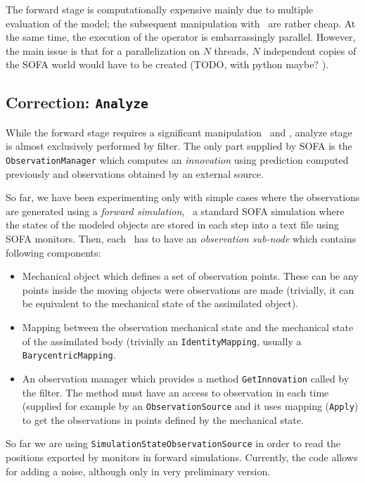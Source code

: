 \documentclass[10pt]{article}
\begin{document}
The forward stage is computationally  expensive mainly due to multiple evaluation of the model; the subsequent manipulation with \sstate\ are rather cheap. At the same time, the execution of the operator is embarrassingly parallel. However, the main issue is that for a parallelization on $N$ threads, $N$ independent copies of the SOFA world would have to be created (TODO, with python maybe? ).


\subsection{Correction: \texttt{Analyze}}
While the forward stage requires a significant manipulation \sstate\ and \asns, analyze stage is almost exclusively performed by filter. The only part supplied by SOFA is the \texttt{ObservationManager} which computes an \emph{innovation} using prediction computed previously and observations obtained by an external source. 

So far, we have been experimenting only with simple cases where the observations are generated using a \emph{forward simulation}, \ie\ a standard SOFA
simulation where the states of the modeled objects are stored in each step into a text file using SOFA monitors. Then, each \asn\ has to have an \emph{observation
sub-node} which contains following components:
\begin{itemize}
\item Mechanical object which defines a set of observation points. These can be any points inside the moving objects were observations are made (trivially, it can be equivalent to the mechanical 
state of the assimilated object).
\item Mapping between the observation mechanical state and the mechanical state of the assimilated body (trivially an \texttt{IdentityMapping}, usually a \texttt{BarycentricMapping}.
\item An observation manager which provides a method \texttt{GetInnovation} called by the filter. The method must have an access to observation in each time (supplied for example by an \texttt{ObservationSource} and it uses mapping (\texttt{Apply}) to get the observations in points
defined by the mechanical state. 
\end{itemize}

So far we are using \texttt{SimulationStateObservationSource} in order to read the positions exported by monitors in forward simulations. Currently, the code allows for adding a noise, although only in very preliminary version.
\end{document}
